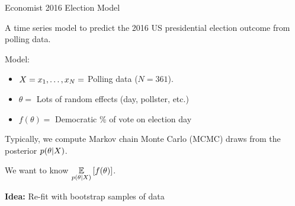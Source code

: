 
\begin{frame}{Economist 2016 Election Model \citep{economist:2020:election}}

\begin{minipage}[t]{0.4\textwidth}
    \ElectionData{}
\end{minipage}
\begin{minipage}[t]{0.59\textwidth}

A time series model to predict the 2016 US presidential election
outcome from polling data.

\spskip
Model:
\begin{itemize}
\item $X = x_1, \ldots, x_N =$ Polling data ($N = 361$).
\item $\theta = $ Lots of random effects (day, pollster, etc.)
\item $f(\theta) = $ Democratic \% of vote on election day
\end{itemize}

\spskip
Typically, we compute Markov chain Monte Carlo (MCMC) draws from the
posterior $p(\theta \vert X)$.

\spskip
We want to know $\underset{p(\theta \vert X)}{\mathbb{E}}\left[f(\theta)\right]$.

\end{minipage}


\pause


        
\textbf{Idea: } Re-fit with bootstrap samples of data \citep{huggins:2023:bayesbag}

%

\pause
{}

\end{frame}







